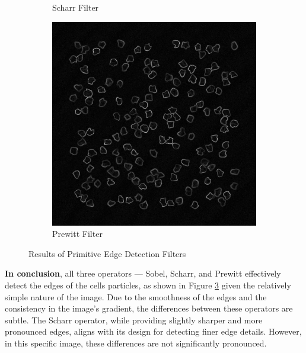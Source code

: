 \documentclass[%
	a4paper, %
	12pt, %
	english, %
	bibtotoc %
]{scrartcl}
\begin{document}
\begin{figure}[H]
\begin{subfigure}[b]{0.4\textwidth}
        \caption{Scharr Filter}
        \label{fig:scharr_filter_img}
    \end{subfigure}
        \hspace{1cm} %
    \begin{subfigure}[b]{0.4\textwidth}
        \centering
        \includegraphics[width=\textwidth]{prewitt_filter.png}
        \caption{Prewitt Filter}
        \label{fig:prewitt_filter_img}
    \end{subfigure}
    \caption{Results of Primitive Edge Detection Filters}
\label{fig:comparison_between_edge_detection_filters}
\end{figure}

\textbf{In conclusion}, all three operators — Sobel, Scharr, and Prewitt effectively detect the edges of the cells particles, as shown in Figure \ref{fig:comparison_between_edge_detection_filters} given the relatively simple nature of the image. Due to the smoothness of the edges and the consistency in the image's gradient, the differences between these operators are subtle. The Scharr operator, while providing slightly sharper and more pronounced edges, aligns with its design for detecting finer edge details. However, in this specific image, these differences are not significantly pronounced.
\end{document}
